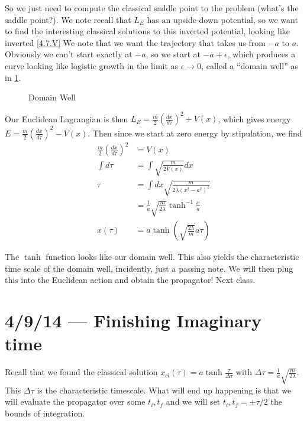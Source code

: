 \documentclass[10pt]{report}
\newcommand{\rd}[2]{\frac{d#1}{d#2}}
\begin{document}
So we just need to compute the classical saddle point to the problem (what's the saddle point?). We note recall that $L_E$ has an upside-down potential, so we want to find the interesting classical solutions to this inverted potential, looking like inverted \ref{4.7.V} We note that we want the trajectory that takes us from $-a$ to $a$. Obviously we can't start exactly at $-a$, so we start at $-a + \epsilon$, which produces a curve looking like logistic growth in the limit as $\epsilon \to 0$, called a ``domain well'' as in \ref{4.7.Well}.
\begin{figure}[!h]
    \centering
    \caption{Domain Well}
    \label{4.7.Well}
\end{figure}

Our Euclidean Lagrangian is then $L_E = \frac{m}{2}\left( \rd{x}{\tau} \right)^2 + V(x)$, which gives energy $E = \frac{m}{2}\left( \rd{x}{\tau} \right)^2 - V(x)$. Then since we start at zero energy by stipulation, we find
\begin{align}
    \frac{m}{2}\left( \rd{x}{\tau} \right)^2 &= V(x)\\
    \int d\tau &= \int \sqrt{\frac{m}{2V(x)}} dx\\
    \tau &= \int dx \sqrt{\frac{m}{2\lambda(x^2 - a^2)^2}}\\
    &= \frac{1}{a}\sqrt{\frac{m}{2\lambda}}\tanh^{-1} \frac{x}{a}\\
    x(\tau) &= a\tanh\left( \sqrt{\frac{2\lambda}{m}}a\tau \right)
\end{align}

The $\tanh$ function looks like our domain well. This also yields the characteristic time scale of the domain well, incidently, just a passing note. We will then plug this into the Euclidean action and obtain the propagator! Next class. 
\chapter{4/9/14 --- Finishing Imaginary time}

Recall that we found the classical solution $x_{cl}(\tau) = a \tanh \frac{\tau}{\Delta \tau}$ with $\Delta \tau = \frac{1}{a}\sqrt{\frac{m}{2\lambda}}$. This $\Delta \tau$ is the characteristic timescale. What will end up happening is that we will evaluate the propagator over some $t_i, t_f$ and we will set $t_i, t_f = \pm \tau/2$ the bounds of integration. 
\end{document}
